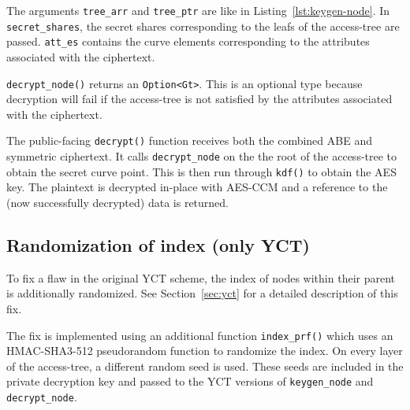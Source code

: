 The arguments \verb+tree_arr+ and \verb+tree_ptr+ are like in Listing~\ref{lst:keygen-node}.
In \verb+secret_shares+, the secret shares corresponding to the leafs of the \gls{access-tree} are passed.
\verb+att_es+ contains the curve elements corresponding to the attributes associated with the ciphertext.

\verb+decrypt_node()+ returns an \verb+Option<Gt>+.
This is an optional type because decryption will fail if the \gls{access-tree} is not satisfied by the attributes associated with the ciphertext.

The public-facing \verb+decrypt()+ function receives both the combined ABE and symmetric ciphertext. 
It calls \verb.decrypt_node. on the the root of the \gls{access-tree} to obtain the secret curve point.
This is then run through \verb+kdf()+ to obtain the AES key.
The plaintext is decrypted in-place with AES-CCM and a reference to the (now successfully decrypted) data is returned.

\subsection{Randomization of index (only YCT)}
To fix a flaw in the original YCT scheme, the index of nodes within their parent is additionally randomized.
See Section~\ref{sec:yct} for a detailed description of this fix.

The fix is implemented using an additional function \verb+index_prf()+ which uses an HMAC-SHA3-512 pseudorandom function to randomize the index.
On every layer of the \gls{access-tree}, a different random seed is used. 
These seeds are included in the private decryption key and passed to the YCT versions of \verb+keygen_node+ and \verb+decrypt_node+.

